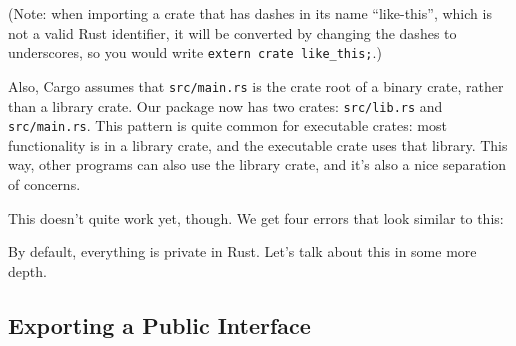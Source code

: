 \documentclass[a4paper,]{book}
\newenvironment{Shaded}{\begin{snugshade}}{\end{snugshade}}
\newcommand{\KeywordTok}[1]{\textcolor[rgb]{0.13,0.29,0.53}{\textbf{{#1}}}}
\newcommand{\StringTok}[1]{\textcolor[rgb]{0.31,0.60,0.02}{{#1}}}
\newcommand{\NormalTok}[1]{{#1}}
\begin{document}
(Note: when importing a crate that has dashes in its name ``like-this'',
which is not a valid Rust identifier, it will be converted by changing
the dashes to underscores, so you would write
\texttt{extern\ crate\ like\_this;}.)

Also, Cargo assumes that \texttt{src/main.rs} is the crate root of a
binary crate, rather than a library crate. Our package now has two
crates: \texttt{src/lib.rs} and \texttt{src/main.rs}. This pattern is
quite common for executable crates: most functionality is in a library
crate, and the executable crate uses that library. This way, other
programs can also use the library crate, and it's also a nice separation
of concerns.

This doesn't quite work yet, though. We get four errors that look
similar to this:

\begin{Shaded}
\end{Shaded}

By default, everything is private in Rust. Let's talk about this in some
more depth.

\subsection{Exporting a Public
Interface}\label{exporting-a-public-interface}
\end{document}
